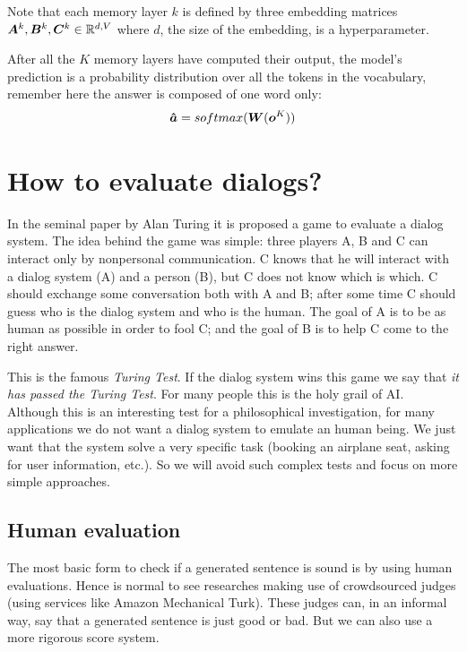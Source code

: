 Note that each memory layer $k$ is defined by three embedding matrices $\bm{A}^{k}, \bm{B}^{k}, \bm{C}^{k} \in \mathbb{R}^{d,V}$ where $d$, the size of the embedding, is a hyperparameter.

After all the $K$ memory layers have computed their output, the model's prediction is a probability distribution over all the tokens in the vocabulary, remember here the answer is composed of one word only:
\begin{equation}
\bm{\hat{a}}= softmax(\bm{W}(\bm{o}^{K}))
\end{equation}

\section{How to evaluate dialogs?}

\label{ch:03-eval}

In the seminal paper by Alan Turing \cite{Turing} it is proposed a game to evaluate a dialog system. The idea behind the game was simple: three players A, B and C can interact only by nonpersonal communication. C knows that he will interact with a dialog system (A) and a person (B), but C does not know which is which. C should exchange some conversation both with A and B; after some time C should guess who is the dialog system and who is the human. The goal of A is to be as human as possible in order to fool C; and the goal of B is to help C come to the right answer.

\par This is the famous \textit{Turing Test}. If the dialog system wins this game we say that \textit{it has passed the Turing Test}. For many people this is the holy grail of AI. Although this is an interesting test for a philosophical investigation, for many applications we do not want a dialog system to emulate an human being. We just want that the system solve a very specific task (booking an airplane seat, asking for user information, etc.). So we will avoid such complex tests and focus on more simple approaches.


\subsection{Human evaluation}

The most basic form to check if a generated sentence is sound is by using human evaluations. Hence is normal to see researches making use of crowdsourced judges (using services like Amazon Mechanical Turk). These judges can, in an informal way,  say that a generated sentence is just good or bad. But we can also use a more rigorous score system. 


